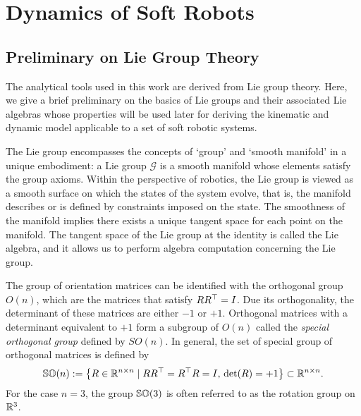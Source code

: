 \chapter{Dynamics of Soft Robots}
\label{ch:2-dynamics} 

\section{Preliminary on Lie Group Theory}
The analytical tools used in this work are derived from Lie group theory. Here, we give a brief preliminary on the basics of Lie groups and their associated Lie algebras whose properties will be used later for deriving the kinematic and dynamic model applicable to a set of soft robotic systems. 

The Lie group encompasses the concepts of `group' and `smooth manifold' in a unique embodiment: a Lie group $\mathcal{G}$ is a smooth manifold whose elements satisfy the group axioms. Within the perspective of robotics, the Lie group is viewed as a smooth surface on which the states of the system evolve, that is, the manifold describes or is defined by constraints imposed on the state. The smoothness of the manifold implies there exists a unique tangent space for each point on the manifold. The tangent space of the Lie group at the identity is called the Lie algebra, and it allows us to perform algebra computation concerning the Lie group.

\begin{definition} The group of orientation matrices can be identified with the orthogonal group $O(n)$, which are the matrices that satisfy ${R}{R}^\top = {I}$. Due its orthogonality, the determinant of these matrices are either $-1$ or $+1$. Orthogonal matrices with a determinant equivalent to $+1$ form a subgroup of $O(n)$ called the \textit{special orthogonal group} defined by $SO(n)$. In general, the set of special group of orthogonal matrices is defined by
\begin{equation}
{\mathbb{SO}(n)}:= \left\{ {R}\in \mathbb{R}^{n \times n} \; | \; {{R}} {R}^\top = {{R}}^\top {R} = {I}, \, \det({R}) = +1 \right\} \subset \mathbb{R}^{n\times n}.
\end{equation}
For the case $n = 3$, the group ${\mathbb{SO}(3)}$ is often referred to as the rotation group on $\mathbb{R}^3$.
\end{definition}

